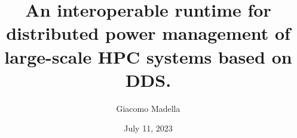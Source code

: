 \documentclass[runningheads]{llncs}
\begin{document}
\title{An interoperable runtime for distributed power management of large-scale HPC systems based on DDS.}
\author{Giacomo Madella}
\date{July 11, 2023}
\maketitle              %



\printbibliography
% 
% 
\end{document}
